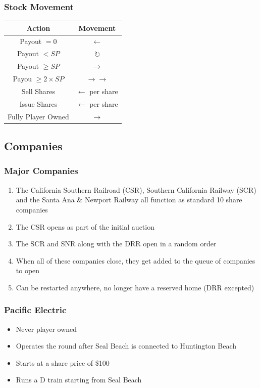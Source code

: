 \documentclass[letterpaper]{article}
\begin{document}
\begin{multicols}{2}
    \subsubsection*{Stock Movement}
    \begin{tabular}{c|c}
      \hline
      \textbf{Action} & \textbf{Movement} \\
      \hline
      \hline
      Payout $= 0$ & $\leftarrow$ \\
      Payout $< SP$ & $\circlearrowright$ \\
      Payout $\geq SP$ & $\rightarrow$ \\
      Payou $\geq 2 \times SP$ & $\rightarrow\rightarrow$ \\
      \hline
      Sell Shares & $\leftarrow$ per share \\
      Issue Shares & $\leftarrow$ per share \\
      Fully Player Owned & $\rightarrow$ \\
      \hline
    \end{tabular}

    \subsection*{Companies}

    \subsubsection*{Major Companies}
    \begin{enumerate}
    \item The California Southern Railroad (CSR), Southern California Railway (SCR)
    and the Santa Ana \& Newport Railway all function as standard 10 share
    companies
    \item The CSR opens as part of the initial auction
    \item The SCR and SNR along with the DRR open in a random order
    \item When all of these companies close, they get added to the queue of companies to open
    \item Can be restarted anywhere, no longer have a reserved home (DRR excepted)
    \end{enumerate}

    \subsubsection*{Pacific Electric}
    \begin{itemize}
    \item Never player owned
    \item Operates the round after Seal Beach is connected to Huntington Beach
    \item Starts at a share price of \$100
    \item Runs a D train starting from Seal Beach
    \end{itemize}

\end{multicols}
\end{document}
